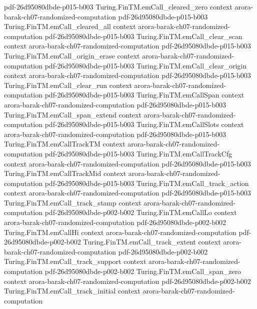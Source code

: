 \begin{theorem}
  {pdf-26d95080dbde-p015-b003}
\proofstep
  {Turing.FinTM.emCall_cleared_zero}
  {context}
  {arora-barak-ch07-randomized-computation}
  {pdf-26d95080dbde-p015-b003}
\proofstep
  {Turing.FinTM.emCall_cleared_all}
  {context}
  {arora-barak-ch07-randomized-computation}
  {pdf-26d95080dbde-p015-b003}
\proofstep
  {Turing.FinTM.emCall_clear_scan}
  {context}
  {arora-barak-ch07-randomized-computation}
  {pdf-26d95080dbde-p015-b003}
\proofstep
  {Turing.FinTM.emCall_origin_erase}
  {context}
  {arora-barak-ch07-randomized-computation}
  {pdf-26d95080dbde-p015-b003}
\proofstep
  {Turing.FinTM.emCall_clear_origin}
  {context}
  {arora-barak-ch07-randomized-computation}
  {pdf-26d95080dbde-p015-b003}
\proofstep
  {Turing.FinTM.emCall_clear_run}
  {context}
  {arora-barak-ch07-randomized-computation}
  {pdf-26d95080dbde-p015-b003}
\proofstep
  {Turing.FinTM.emCallSpan}
  {context}
  {arora-barak-ch07-randomized-computation}
  {pdf-26d95080dbde-p015-b003}
\proofstep
  {Turing.FinTM.emCall_span_extend}
  {context}
  {arora-barak-ch07-randomized-computation}
  {pdf-26d95080dbde-p015-b003}
\proofstep
  {Turing.FinTM.emCallSlots}
  {context}
  {arora-barak-ch07-randomized-computation}
  {pdf-26d95080dbde-p015-b003}
\proofstep
  {Turing.FinTM.emCallTrackTM}
  {context}
  {arora-barak-ch07-randomized-computation}
  {pdf-26d95080dbde-p015-b003}
\proofstep
  {Turing.FinTM.emCallTrackCfg}
  {context}
  {arora-barak-ch07-randomized-computation}
  {pdf-26d95080dbde-p015-b003}
\proofstep
  {Turing.FinTM.emCallTrackMid}
  {context}
  {arora-barak-ch07-randomized-computation}
  {pdf-26d95080dbde-p015-b003}
\proofstep
  {Turing.FinTM.emCall_track_action}
  {context}
  {arora-barak-ch07-randomized-computation}
  {pdf-26d95080dbde-p015-b003}
\proofstep
  {Turing.FinTM.emCall_track_stamp}
  {context}
  {arora-barak-ch07-randomized-computation}
  {pdf-26d95080dbde-p002-b002}
\proofstep
  {Turing.FinTM.emCallLo}
  {context}
  {arora-barak-ch07-randomized-computation}
  {pdf-26d95080dbde-p002-b002}
\proofstep
  {Turing.FinTM.emCallHi}
  {context}
  {arora-barak-ch07-randomized-computation}
  {pdf-26d95080dbde-p002-b002}
\proofstep
  {Turing.FinTM.emCall_track_extent}
  {context}
  {arora-barak-ch07-randomized-computation}
  {pdf-26d95080dbde-p002-b002}
\proofstep
  {Turing.FinTM.emCall_track_support}
  {context}
  {arora-barak-ch07-randomized-computation}
  {pdf-26d95080dbde-p002-b002}
\proofstep
  {Turing.FinTM.emCall_span_zero}
  {context}
  {arora-barak-ch07-randomized-computation}
  {pdf-26d95080dbde-p002-b002}
\proofstep
  {Turing.FinTM.emCall_track_initial}
  {context}
  {arora-barak-ch07-randomized-computation}

\end{theorem}
